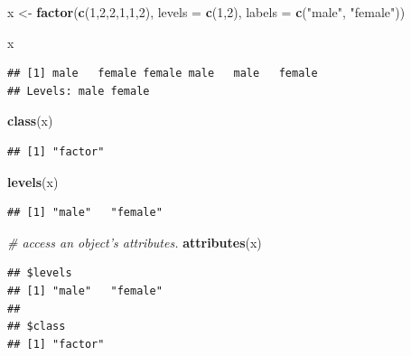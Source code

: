 \documentclass[]{book}
\newenvironment{Shaded}{\begin{snugshade}}{\end{snugshade}}
\newcommand{\KeywordTok}[1]{\textcolor[rgb]{0.13,0.29,0.53}{\textbf{{#1}}}}
\newcommand{\DataTypeTok}[1]{\textcolor[rgb]{0.13,0.29,0.53}{{#1}}}
\newcommand{\DecValTok}[1]{\textcolor[rgb]{0.00,0.00,0.81}{{#1}}}
\newcommand{\StringTok}[1]{\textcolor[rgb]{0.31,0.60,0.02}{{#1}}}
\newcommand{\CommentTok}[1]{\textcolor[rgb]{0.56,0.35,0.01}{\textit{{#1}}}}
\newcommand{\NormalTok}[1]{{#1}}
\begin{document}
\begin{Shaded}
\begin{Highlighting}[]
\NormalTok{x <-}\StringTok{ }\KeywordTok{factor}\NormalTok{(}\KeywordTok{c}\NormalTok{(}\DecValTok{1}\NormalTok{,}\DecValTok{2}\NormalTok{,}\DecValTok{2}\NormalTok{,}\DecValTok{1}\NormalTok{,}\DecValTok{1}\NormalTok{,}\DecValTok{2}\NormalTok{), }\DataTypeTok{levels =} \KeywordTok{c}\NormalTok{(}\DecValTok{1}\NormalTok{,}\DecValTok{2}\NormalTok{), }\DataTypeTok{labels =} \KeywordTok{c}\NormalTok{(}\StringTok{"male"}\NormalTok{, }\StringTok{"female"}\NormalTok{))}
\end{Highlighting}
\end{Shaded}

\begin{Shaded}
\begin{Highlighting}[]
\NormalTok{x}
\end{Highlighting}
\end{Shaded}

\begin{verbatim}
## [1] male   female female male   male   female
## Levels: male female
\end{verbatim}

\begin{Shaded}
\begin{Highlighting}[]
\KeywordTok{class}\NormalTok{(x)}
\end{Highlighting}
\end{Shaded}

\begin{verbatim}
## [1] "factor"
\end{verbatim}

\begin{Shaded}
\begin{Highlighting}[]
\KeywordTok{levels}\NormalTok{(x)}
\end{Highlighting}
\end{Shaded}

\begin{verbatim}
## [1] "male"   "female"
\end{verbatim}

\begin{Shaded}
\begin{Highlighting}[]
\CommentTok{# access an object's attributes.}
\KeywordTok{attributes}\NormalTok{(x)}
\end{Highlighting}
\end{Shaded}

\begin{verbatim}
## $levels
## [1] "male"   "female"
## 
## $class
## [1] "factor"
\end{verbatim}
\end{document}
